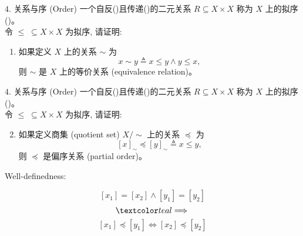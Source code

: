 \begin{frame}{}
  \begin{exampleblock}{$4.$ 关系与序 (Order)}
    一个自反()且传递()的二元关系 $R \subseteq X \times X$ 
    称为 $X$ 上的拟序 ()。\\[8pt]

    令 $\le \;\subseteq X \times X$ 为拟序, 请证明:
    \begin{enumerate}[(1)]
      \item 如果定义 $X$ 上的关系 $\sim$ 为
	\[
	  x \sim y \triangleq x \le y \land y \le x,
	\]
	则 $\sim$ 是 $X$ 上的等价关系 (equivalence relation)。
    \end{enumerate}
  \end{exampleblock}

  \pause
  \vspace{0.50cm}
  \centerline{}
\end{frame}

\begin{frame}{}
  \begin{exampleblock}{$4.$ 关系与序 (Order)}
    一个自反()且传递()的二元关系 $R \subseteq X \times X$ 
    称为 $X$ 上的拟序 ()。\\[8pt]

    令 $\le \;\subseteq X \times X$ 为拟序, 请证明:
    \begin{enumerate}[(1)]
      \setcounter{enumi}{1}
      \item 如果定义商集 (quotient set) $X/\sim$ 上的关系 $\preceq$ 为
	\[
	  [x]_{\sim} \preceq [y]_{\sim} \triangleq x \le y,
	\]
	则 $\preceq$ 是偏序关系 (partial order)。
    \end{enumerate}
  \end{exampleblock}

  \pause
  \vspace{0.30cm}
  \centerline{}

  \pause
  \vspace{0.60cm}
  \centerline{}
\end{frame}

\begin{frame}{}
  \centerline{\large Well-definedness: }

  \pause
  \vspace{0.50cm}
  \[
    [x_1] = [x_2] \land [y_1] = [y_2]
  \]
  \[
    \teal{\implies}
  \]
  \[
    [x_1] \preceq [y_1] \iff [x_2] \preceq [y_2]
  \]
\end{frame}

